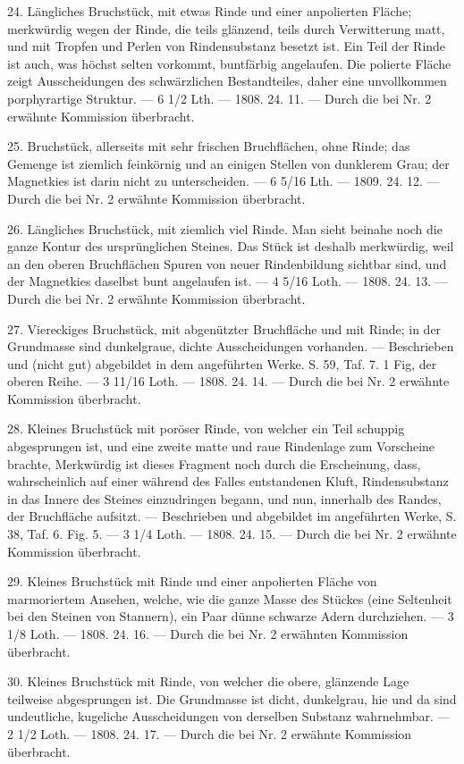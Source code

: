 \documentclass[a4paper, 11pt, oneside, polutonikogreek, german]{article}
\begin{document}
24. Längliches Bruchstück, mit etwas Rinde und einer anpolierten Fläche; merkwürdig wegen der Rinde, die teils glänzend, teils durch Verwitterung matt, und mit Tropfen und Perlen von Rindensubstanz besetzt ist. Ein Teil der Rinde ist auch, was höchst selten vorkommt, buntfärbig angelaufen. Die polierte Fläche zeigt Ausscheidungen des schwärzlichen Bestandteiles, daher eine unvollkommen porphyrartige Struktur. — 6 1/2 Lth. — 1808. 24. 11. — Durch die bei Nr. 2 erwähnte Kommission überbracht.

25. Bruchstück, allerseits mit sehr frischen Bruchflächen, ohne Rinde; das Gemenge ist ziemlich feinkörnig und an einigen Stellen von dunklerem Grau; der Magnetkies ist darin nicht zu unterscheiden. — 6 5/16 Lth. — 1809. 24. 12. — Durch die bei Nr. 2 erwähnte Kommission überbracht.

26. Längliches Bruchstück, mit ziemlich viel Rinde. Man sieht beinahe noch die ganze Kontur des ursprünglichen Steines. Das Stück ist deshalb merkwürdig, weil an den oberen Bruchflächen Spuren von neuer Rindenbildung sichtbar sind, und der Magnetkies daselbst bunt angelaufen ist. — 4 5/16 Loth. — 1808. 24. 13. — Durch die bei Nr. 2 erwähnte Kommission überbracht.

27. Viereckiges Bruchstück, mit abgenützter Bruchfläche und mit Rinde; in der Grundmasse sind dunkelgraue, dichte Ausscheidungen vorhanden. — Beschrieben und (nicht gut) abgebildet in dem angeführten Werke. S. 59, Taf. 7. 1 Fig, der oberen Reihe. — 3 11/16 Loth. — 1808. 24. 14. — Durch die bei Nr. 2 erwähnte Kommission überbracht.

28. Kleines Bruchstück mit poröser Rinde, von welcher ein Teil schuppig abgesprungen ist, und eine zweite matte und raue Rindenlage zum Vorscheine brachte, Merkwürdig ist dieses Fragment noch durch die Erscheinung, dass, wahrscheinlich auf einer während des Falles entstandenen Kluft, Rindensubstanz in das Innere des Steines einzudringen begann, und nun, innerhalb des Randes, der Bruchfläche aufsitzt. — Beschrieben und abgebildet im angeführten Werke, S. 38, Taf. 6. Fig. 5. — 3 1/4 Loth. — 1808. 24. 15. — Durch die bei Nr. 2 erwähnte Kommission überbracht.

29. Kleines Bruchstück mit Rinde und einer anpolierten Fläche von marmoriertem Ansehen, welche, wie die ganze Masse des Stückes (eine Seltenheit bei den Steinen von Stannern), ein Paar dünne schwarze Adern durchziehen. — 3 1/8 Loth. — 1808. 24. 16. — Durch die bei Nr. 2 erwähnten Kommission überbracht.

30. Kleines Bruchstück mit Rinde, von welcher die obere, glänzende Lage teilweise abgesprungen ist. Die Grundmasse ist dicht, dunkelgrau, hie und da sind undeutliche, kugeliche Ausscheidungen von derselben Substanz wahrnehmbar. — 2 1/2 Loth. — 1808. 24. 17. — Durch die bei Nr. 2 erwähnte Kommission überbracht.
\end{document}
